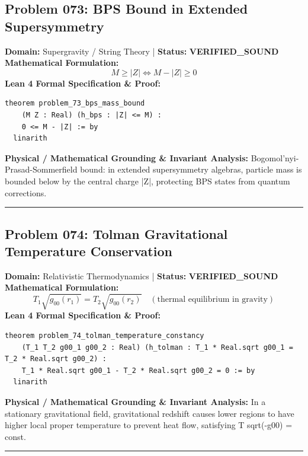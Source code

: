 \documentclass[10pt,a4paper]{article}
\begin{document}
\subsection*{Problem 073: BPS Bound in Extended Supersymmetry}
\textbf{Domain:} Supergravity / String Theory \quad | \quad \textbf{Status:} \textcolor{green!70!black}{\textbf{VERIFIED\_SOUND}}\\
\textbf{Mathematical Formulation:}
\begin{equation*}
  M \ge |Z| \iff M - |Z| \ge 0
\end{equation*}
\textbf{Lean 4 Formal Specification \& Proof:}
\begin{lstlisting}
theorem problem_73_bps_mass_bound
    (M Z : Real) (h_bps : |Z| <= M) :
    0 <= M - |Z| := by
  linarith
\end{lstlisting}
\textbf{Physical / Mathematical Grounding \& Invariant Analysis:}
Bogomol'nyi-Prasad-Sommerfield bound: in extended supersymmetry algebras, particle mass is bounded below by the central charge |Z|, protecting BPS states from quantum corrections.
\vspace{0.8em}\hrule\vspace{0.8em}
\subsection*{Problem 074: Tolman Gravitational Temperature Conservation}
\textbf{Domain:} Relativistic Thermodynamics \quad | \quad \textbf{Status:} \textcolor{green!70!black}{\textbf{VERIFIED\_SOUND}}\\
\textbf{Mathematical Formulation:}
\begin{equation*}
  T_1 \sqrt{g_{00}(r_1)} = T_2 \sqrt{g_{00}(r_2)} \quad (\text{thermal equilibrium in gravity})
\end{equation*}
\textbf{Lean 4 Formal Specification \& Proof:}
\begin{lstlisting}
theorem problem_74_tolman_temperature_constancy
    (T_1 T_2 g00_1 g00_2 : Real) (h_tolman : T_1 * Real.sqrt g00_1 = T_2 * Real.sqrt g00_2) :
    T_1 * Real.sqrt g00_1 - T_2 * Real.sqrt g00_2 = 0 := by
  linarith
\end{lstlisting}
\textbf{Physical / Mathematical Grounding \& Invariant Analysis:}
In a stationary gravitational field, gravitational redshift causes lower regions to have higher local proper temperature to prevent heat flow, satisfying T sqrt(-g00) = const.
\vspace{0.8em}\hrule\vspace{0.8em}
\end{document}
